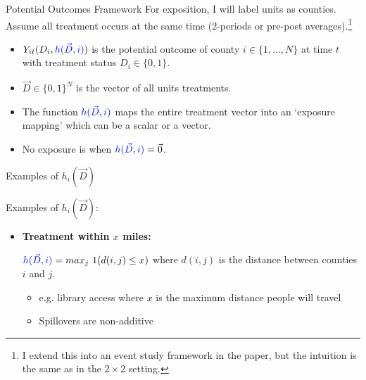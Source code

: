\documentclass[aspectratio=169]{beamer}
\begin{document}
\begin{frame}{Potential Outcomes Framework}
    For exposition, I will label units as counties. Assume all treatment occurs at the same time (2-periods or pre-post averages).\footnote{I extend this into an event study framework in the paper, but the intuition is the same as in the $2 \times 2$ setting.}
    
    \begin{itemize}
        \item $Y_{it}(D_i, \textcolor{blue}{h(\vec{D}, i)})$ is the potential outcome of county $i \in \{ 1, \dots, N \}$ at time $t$ with treatment status $D_i \in \{0, 1\}$.
        
        \item $\vec{D} \in \{0,1\}^N$ is the vector of all units treatments.
        
        \pause
        \item The function $\textcolor{blue}{h(\vec{D}, i)}$ maps the entire treatment vector into an `exposure mapping' which can be a scalar or a vector.
        
        \pause
        \item No exposure is when $\textcolor{blue}{h(\vec{D}, i)} = \vec{0}$.
    \end{itemize}
\end{frame}


\begin{frame}{Examples of $h_i(\vec{D})$}
    
    Examples of $h_i(\vec{D})$:
    
    \begin{itemize}
        \item \textbf{Treatment within $x$ miles:}
        
        $\textcolor{blue}{h(\vec{D}, i)} = max_j \ 1(d(i, j) \leq x)$ where $d(i,j)$ is the distance between counties $i$ and $j$. 

        \begin{itemize}
            \item e.g. library access where $x$ is the maximum distance people will travel
            
            \item Spillovers are non-additive
        \end{itemize}

    \end{itemize}
\end{frame}
\end{document}
